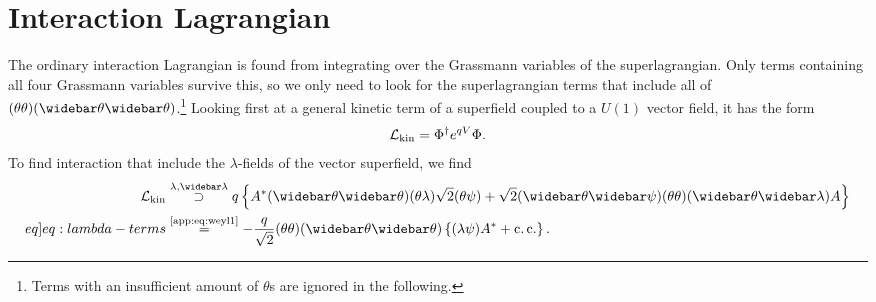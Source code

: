 \documentclass[english, notitlepage]{article}
\begin{document}
    \section{Interaction Lagrangian}
        The ordinary interaction Lagrangian is found from integrating over the Grassmann variables of the superlagrangian. Only terms containing all four Grassmann variables survive this, so we only need to look for the superlagrangian terms that include all of $(\theta\theta)(\wbar\theta\wbar\theta)$.\footnote{Terms with an insufficient amount of $\theta$s are ignored in the following.} Looking first at a general kinetic term of a superfield coupled to a $U(1)$ vector field, it has the form
        \begin{align}
            {\mathcal{L}}_\text{kin} = \Phi^\dag e^{qV} \Phi.
        \end{align}
        To find interaction that include the $\lambda$-fields of the vector superfield, we find
        \begin{align} \nonumber
            \msub{\L}{kin} &\stackrel{\lambda, \wbar\lambda}{\supset} q\cclosed{ A^* (\wbar\theta\wbar\theta)(\theta\lambda) \sqrt{2} (\theta\psi) + \sqrt{2} (\wbar\theta\wbar\psi) (\theta\theta)(\wbar\theta\wbar\lambda) A } \\ \label[eq]{eq:lambda-terms}
            &\stackrel{\text{\cref{app:eq:weyl1}}}{=} -\frac{q}{\sqrt{2}} (\theta\theta)(\wbar\theta\wbar\theta) \cclosed{ (\lambda\psi)A^* + \cc }.
        \end{align}
\end{document}
